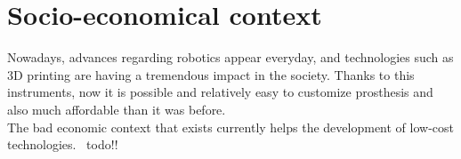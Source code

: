 \chapter{Socio-economical context}

Nowadays, advances regarding robotics appear everyday, and technologies such as 3D printing are having a tremendous impact in the society. Thanks to this instruments, now it is possible and relatively easy to customize prosthesis and also much affordable than it was before. 
\\

The bad economic context that exists currently helps the development of low-cost technologies. 
\ todo!! 

